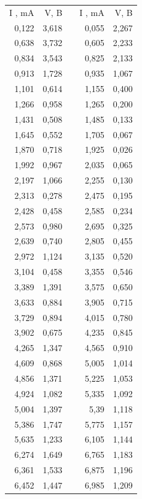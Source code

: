 \documentclass[14pt,a4paper]{scrartcl}
\begin{document}
\begin{center}
\begin{table}[]
\begin{tabular}{rrlrr}
I , mA & V, B  &  & I , mA & V, B  \\
0,122  & 3,618 &  & 0,055  & 2,267 \\
0,638  & 3,732 &  & 0,605  & 2,233 \\
0,834  & 3,543 &  & 0,825  & 2,133 \\
0,913  & 1,728 &  & 0,935  & 1,067 \\
1,101  & 0,614 &  & 1,155  & 0,400 \\
1,266  & 0,958 &  & 1,265  & 0,200 \\
1,431  & 0,508 &  & 1,485  & 0,133 \\
1,645  & 0,552 &  & 1,705  & 0,067 \\
1,870  & 0,718 &  & 1,925  & 0,026 \\
1,992  & 0,967 &  & 2,035  & 0,065 \\
2,197  & 1,066 &  & 2,255  & 0,130 \\
2,313  & 0,278 &  & 2,475  & 0,195 \\
2,428  & 0,458 &  & 2,585  & 0,234 \\
2,573  & 0,980 &  & 2,695  & 0,325 \\
2,639  & 0,740 &  & 2,805  & 0,455 \\
2,972  & 1,124 &  & 3,135  & 0,520 \\
3,104  & 0,458 &  & 3,355  & 0,546 \\
3,389  & 1,391 &  & 3,575  & 0,650 \\
3,633  & 0,884 &  & 3,905  & 0,715 \\
3,729  & 0,894 &  & 4,015  & 0,780 \\
3,902  & 0,675 &  & 4,235  & 0,845 \\
4,265  & 1,347 &  & 4,565  & 0,910 \\
4,609  & 0,868 &  & 5,005  & 1,014 \\
4,856  & 1,371 &  & 5,225  & 1,053 \\
4,924  & 1,082 &  & 5,335  & 1,092 \\
5,004  & 1,397 &  & 5,39   & 1,118 \\
5,386  & 1,747 &  & 5,775  & 1,157 \\
5,635  & 1,233 &  & 6,105  & 1,144 \\
6,274  & 1,649 &  & 6,765  & 1,183 \\
6,361  & 1,533 &  & 6,875  & 1,196 \\
6,452  & 1,447 &  & 6,985  & 1,209 \\

\end{tabular}
\end{table}
\end{center}
\end{document}
